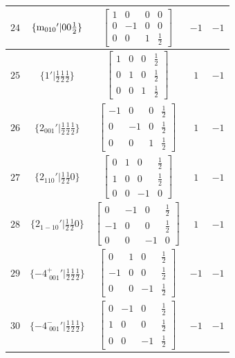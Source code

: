 \documentclass[fleqn,8pt]{jsarticle}
\begin{document}
\begin{longtable}{ccccc}
$ 24 $ & $ \{{\rm m}_{010}{}'|0 0 \frac{1}{2}\} $ & $ \begin{bmatrix} 1 & 0 & 0 & 0 \\ 0 & -1 & 0 & 0 \\ 0 & 0 & 1 & \frac{1}{2} \end{bmatrix} $ & $ -1 $ & $ -1 $ \\ \hline
$ 25 $ & $ \{1{}'|\frac{1}{2} \frac{1}{2} \frac{1}{2}\} $ & $ \begin{bmatrix} 1 & 0 & 0 & \frac{1}{2} \\ 0 & 1 & 0 & \frac{1}{2} \\ 0 & 0 & 1 & \frac{1}{2} \end{bmatrix} $ & $ 1 $ & $ -1 $ \\ \hline
$ 26 $ & $ \{2{}_{001}{}'|\frac{1}{2} \frac{1}{2} \frac{1}{2}\} $ & $ \begin{bmatrix} -1 & 0 & 0 & \frac{1}{2} \\ 0 & -1 & 0 & \frac{1}{2} \\ 0 & 0 & 1 & \frac{1}{2} \end{bmatrix} $ & $ 1 $ & $ -1 $ \\ \hline
$ 27 $ & $ \{2{}_{110}{}'|\frac{1}{2} \frac{1}{2} 0\} $ & $ \begin{bmatrix} 0 & 1 & 0 & \frac{1}{2} \\ 1 & 0 & 0 & \frac{1}{2} \\ 0 & 0 & -1 & 0 \end{bmatrix} $ & $ 1 $ & $ -1 $ \\ \hline
$ 28 $ & $ \{2{}_{1-10}{}'|\frac{1}{2} \frac{1}{2} 0\} $ & $ \begin{bmatrix} 0 & -1 & 0 & \frac{1}{2} \\ -1 & 0 & 0 & \frac{1}{2} \\ 0 & 0 & -1 & 0 \end{bmatrix} $ & $ 1 $ & $ -1 $ \\ \hline
$ 29 $ & $ \{-4^{+}_{\,\,001}{}'|\frac{1}{2} \frac{1}{2} \frac{1}{2}\} $ & $ \begin{bmatrix} 0 & 1 & 0 & \frac{1}{2} \\ -1 & 0 & 0 & \frac{1}{2} \\ 0 & 0 & -1 & \frac{1}{2} \end{bmatrix} $ & $ -1 $ & $ -1 $ \\ \hline
$ 30 $ & $ \{-4^{-}_{\,\,001}{}'|\frac{1}{2} \frac{1}{2} \frac{1}{2}\} $ & $ \begin{bmatrix} 0 & -1 & 0 & \frac{1}{2} \\ 1 & 0 & 0 & \frac{1}{2} \\ 0 & 0 & -1 & \frac{1}{2} \end{bmatrix} $ & $ -1 $ & $ -1 $ \\ \hline

\end{longtable}
\end{document}
